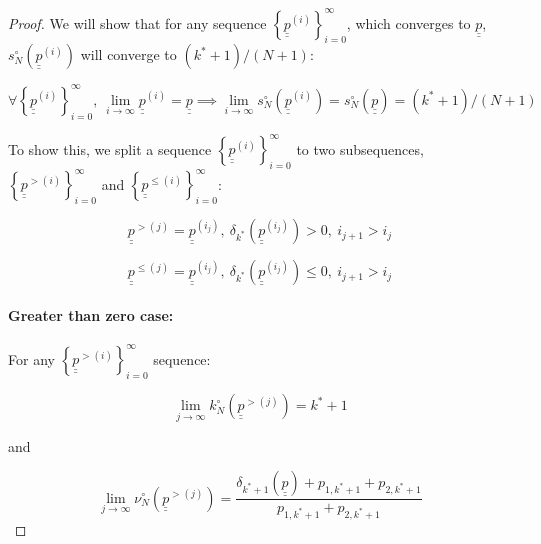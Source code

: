 \documentclass{article}
\theoremstyle{definition}
\begin{document}
\begin{proof}
    We will show that for any sequence $\left \{ \underline{\underline{p}}^{(i)} \right \}_{i=0}^\infty$, which converges to $\underline{\underline{p}}$, $s^\circ_N(\underline{\underline{p}}^{(i)})$ will converge to $(k^*+1)/(N+1)$:

    \begin{equation}
        \forall \left \{ \underline{\underline{p}}^{(i)} \right \}_{i=0}^\infty, \ \lim_{i\to\infty} \underline{\underline{p}}^{(i)} = \underline{\underline{p}} \implies
        \lim_{i\to\infty} s^\circ_N(\underline{\underline{p}}^{(i)}) = s^\circ_N (\underline{\underline{p}}) = (k^*+1)/(N+1)
    \end{equation}

    To show this, we split a sequence $\left \{ \underline{\underline{p}}^{(i)} \right \}_{i=0}^\infty$ to two subsequences, $\left \{ \underline{\underline{p}}^{> (i)} \right \}_{i=0}^\infty$ and $\left \{ \underline{\underline{p}}^{\le (i)} \right \}_{i=0}^\infty$:

    \begin{equation}
        \underline{\underline{p}}^{> (j)} = 
        \underline{\underline{p}}^{(i_j)}, \ \delta_{k^*}(\underline{\underline{p}}^{(i_j)}) > 0, \ i_{j+1} > i_j
    \end{equation}

        \begin{equation}
        \underline{\underline{p}}^{\le (j)} = 
        \underline{\underline{p}}^{(i_j)}, \ \delta_{k^*}(\underline{\underline{p}}^{(i_j)}) \le 0, \ i_{j+1} > i_j
    \end{equation}

    \paragraph{Greater than zero case:}

    For any $\left \{ \underline{\underline{p}}^{> (i)} \right \}_{i=0}^\infty$ sequence:

    \begin{equation}
        \lim_{j\to\infty} k^\circ_N (\underline{\underline{p}}^{> (j)}) = k^* + 1
    \end{equation}

    and 

    \begin{equation}
        \lim_{j\to\infty} \nu^\circ_N (\underline{\underline{p}}^{> (j)}) = 
        \frac{\delta_{k^*+1}(\underline{\underline{p}}) + p_{1,k^*+1}+p_{2,k^*+1} }
        {p_{1,k^*+1}+p_{2,k^*+1}}
    \end{equation}


\end{proof}
\end{document}
